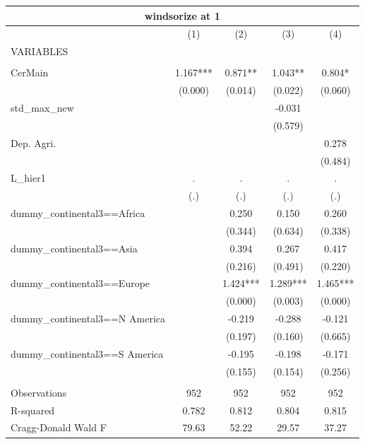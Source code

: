 \documentclass[12pt,a4paper]{article}
\begin{document}
\begin{tabular}{lcccc}
\multicolumn{5}{c}{windsorize at 1} \\ \hline
 & (1) & (2) & (3) & (4) \\
VARIABLES &  &  &  &  \\ \hline
 &  &  &  &  \\
CerMain & 1.167*** & 0.871** & 1.043** & 0.804* \\
 & (0.000) & (0.014) & (0.022) & (0.060) \\
std\_max\_new &  &  & -0.031 &  \\
 &  &  & (0.579) &  \\
Dep. Agri. &  &  &  & 0.278 \\
 &  &  &  & (0.484) \\
L\_hier1 & . & . & . & . \\
 & (.) & (.) & (.) & (.) \\
dummy\_continental3==Africa &  & 0.250 & 0.150 & 0.260 \\
 &  & (0.344) & (0.634) & (0.338) \\
dummy\_continental3==Asia &  & 0.394 & 0.267 & 0.417 \\
 &  & (0.216) & (0.491) & (0.220) \\
dummy\_continental3==Europe &  & 1.424*** & 1.289*** & 1.465*** \\
 &  & (0.000) & (0.003) & (0.000) \\
dummy\_continental3==N America &  & -0.219 & -0.288 & -0.121 \\
 &  & (0.197) & (0.160) & (0.665) \\
dummy\_continental3==S America &  & -0.195 & -0.198 & -0.171 \\
 &  & (0.155) & (0.154) & (0.256) \\
 &  &  &  &  \\
Observations & 952 & 952 & 952 & 952 \\
R-squared & 0.782 & 0.812 & 0.804 & 0.815 \\
 Cragg-Donald Wald F & 79.63 & 52.22 & 29.57 & 37.27 \\ \hline
\end{tabular}
\end{document}
